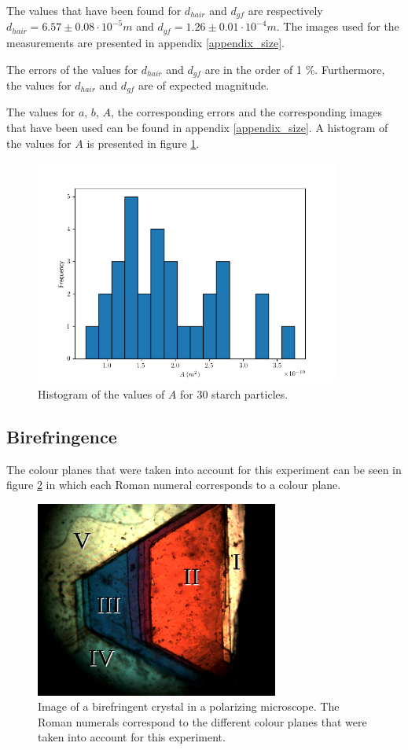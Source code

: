 The values that have been found for $d_{hair}$ and $d_{gf}$ are respectively $d_{hair} = 6.57 \pm 0.08 \cdot 10^{-5} m $ and $d_{gf} =  1.26 \pm 0.01 \cdot 10^{-4} m $. The images used for the measurements are presented in appendix \ref{appendix_size}.

The errors of the values for $d_{hair}$ and $d_{gf}$ are in the order of 1 \%. Furthermore, the values for $d_{hair}$ and $d_{gf}$ are of expected magnitude.

The values for $a$, $b$, $A$, the corresponding errors and the corresponding images that have been used can be found in appendix \ref{appendix_size}. A histogram of the values for $A$ is presented in figure \ref{fig_histogram_zetmeel}.

\begin{figure}[h!]
	\centering
    \includegraphics[width=10cm,keepaspectratio]{afbeeldingen/histogram_zetmeel.png}
    \caption{Histogram of the values of $A$ for 30 starch particles.}
    \label{fig_histogram_zetmeel}
\end{figure}


\subsection{Birefringence}

The colour planes that were taken into account for this experiment can be seen in figure \ref{fig_bf_planes} in which each Roman numeral corresponds to a colour plane.

\begin{figure}[h!]
	\centering
	\includegraphics[width=8cm]{afbeeldingen/bf_colourplanes.png}
	\caption{Image of a birefringent crystal in a polarizing microscope. The Roman numerals correspond to the different colour planes that were taken into account for this experiment.}
	\label{fig_bf_planes}
\end{figure}

